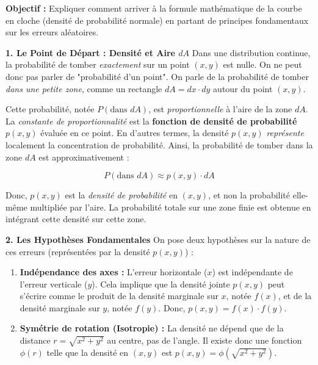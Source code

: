 \begin{proofbox}
\begin{center}
\end{center}

\textbf{Objectif :} Expliquer comment arriver à la formule mathématique de la courbe en cloche (densité de probabilité normale) en partant de principes fondamentaux sur les erreurs aléatoires.

\textbf{1. Le Point de Départ : Densité et Aire $dA$}
\newline
Dans une distribution continue, la probabilité de tomber \textit{exactement} sur un point $(x, y)$ est nulle. On ne peut donc pas parler de "probabilité d'un point". On parle de la probabilité de tomber \textit{dans une petite zone}, comme un rectangle $dA = dx \cdot dy$ autour du point $(x, y)$.

Cette probabilité, notée $P(\text{dans } dA)$, est \textit{proportionnelle} à l'aire de la zone $dA$. La \textit{constante de proportionnalité} est la \textbf{fonction de densité de probabilité} $p(x, y)$ évaluée en ce point. En d'autres termes, la densité $p(x, y)$ \textit{représente} localement la concentration de probabilité. Ainsi, la probabilité de tomber dans la zone $dA$ est approximativement :

$$ P(\text{dans } dA) \approx p(x, y) \cdot dA $$

Donc, $p(x, y)$ est la \textit{densité de probabilité} en $(x, y)$, et non la probabilité elle-même multipliée par l'aire. La probabilité totale sur une zone finie est obtenue en intégrant cette densité sur cette zone.

\textbf{2. Les Hypothèses Fondamentales}
\newline
On pose deux hypothèses sur la nature de ces erreurs (représentées par la densité $p(x, y)$) :
\begin{enumerate}
    \item \textbf{Indépendance des axes :} L'erreur horizontale ($x$) est indépendante de l'erreur verticale ($y$). Cela implique que la densité jointe $p(x, y)$ peut s'écrire comme le produit de la densité marginale sur $x$, notée $f(x)$, et de la densité marginale sur $y$, notée $f(y)$. Donc, $p(x, y) = f(x) \cdot f(y)$.
    \item \textbf{Symétrie de rotation (Isotropie) :} La densité ne dépend que de la distance $r = \sqrt{x^2 + y^2}$ au centre, pas de l'angle. Il existe donc une fonction $\phi(r)$ telle que la densité en $(x,y)$ est $p(x, y) = \phi(\sqrt{x^2 + y^2})$.
\end{enumerate}


\end{proofbox}
